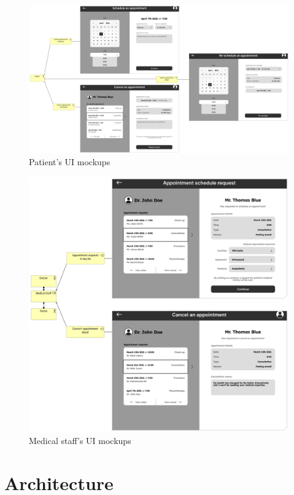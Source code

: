 \documentclass[11pt,english,a4paper,twoside]{article}
\begin{document}
\begin{figure}[H]
    \centering
    \includegraphics[width=\textwidth]{./fig/2. Business Frontend Patient.png}
    \caption{Patient's UI mockups}
    \label{fig:patient-mockups}
\end{figure}

\begin{figure}[H]
    \centering
    \includegraphics[width=\textwidth]{./fig/3. Business Frontend Medical staff.png}
    \caption{Medical staff's UI mockups}
    \label{fig:medical-staff-mockups}
\end{figure}

\section{Architecture}
\end{document}
